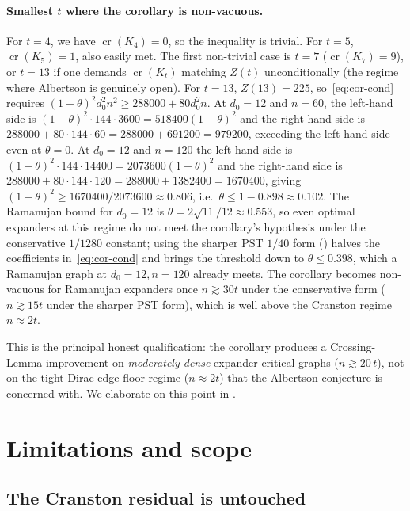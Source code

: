 \documentclass[11pt,a4paper]{article}
\theoremstyle{definition}
\DeclareMathOperator{\crN}{cr}
\begin{document}
\paragraph{Smallest $t$ where the corollary is non-vacuous.}
For $t = 4$, we have $\crN(K_4) = 0$, so the inequality is
trivial. For $t = 5$, $\crN(K_5) = 1$, also easily met. The
first non-trivial case is $t = 7$ ($\crN(K_7) = 9$), or
$t = 13$ if one demands $\crN(K_t)$ matching $Z(t)$ unconditionally
(the regime where Albertson is genuinely open). For
$t = 13$, $Z(13) = 225$, so~\eqref{eq:cor-cond} requires
$(1 - \theta)^{2} d_0^{2} n^{2} \ge 288000 + 80 d_0^{2} n$. At
$d_0 = 12$ and $n = 60$, the left-hand side is
$(1 - \theta)^{2} \cdot 144 \cdot 3600 = 518400 (1 - \theta)^{2}$
and the right-hand side is $288000 + 80 \cdot 144 \cdot 60
= 288000 + 691200 = 979200$, exceeding the left-hand side
even at $\theta = 0$. At $d_0 = 12$ and $n = 120$ the
left-hand side is $(1 - \theta)^{2} \cdot 144 \cdot 14400
= 2073600 (1 - \theta)^{2}$ and the right-hand side is
$288000 + 80 \cdot 144 \cdot 120 = 288000 + 1382400 = 1670400$,
giving $(1 - \theta)^{2} \ge 1670400 / 2073600 \approx 0.806$,
i.e.\ $\theta \le 1 - 0.898 \approx 0.102$. The Ramanujan bound
for $d_0 = 12$ is $\theta = 2\sqrt{11}/12 \approx 0.553$, so
even optimal expanders at this regime do not meet the corollary's
hypothesis under the conservative $1/1280$ constant; using the
sharper PST $1/40$ form () halves the
coefficients in~\eqref{eq:cor-cond} and brings the threshold
down to $\theta \le 0.398$, which a Ramanujan graph at
$d_0 = 12, n = 120$ already meets.
The corollary becomes non-vacuous for Ramanujan
expanders once $n \gtrsim 30 t$ under the conservative form
($n \gtrsim 15 t$ under the sharper PST form), which is well
above the Cranston regime $n \approx 2 t$.

This is the principal honest qualification: the corollary
produces a Crossing-Lemma improvement on \emph{moderately dense}
expander critical graphs ($n \gtrsim 20\,t$), not on the tight
Dirac-edge-floor regime ($n \approx 2 t$) that the Albertson
conjecture is concerned with. We elaborate on this point in
.

\section{Limitations and scope}\label{sec:limitations}

\subsection{The Cranston residual is untouched}\label{ssec:cranston}
\end{document}
